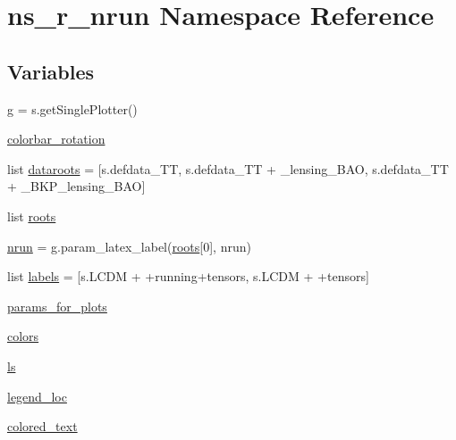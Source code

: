 \hypertarget{namespacens__r__nrun}{}\section{ns\+\_\+r\+\_\+nrun Namespace Reference}
\label{namespacens__r__nrun}
\subsection*{Variables}
\begin{DoxyCompactItemize}
\item 
\mbox{\hyperlink{namespacens__r__nrun_a424a0368f850ddbc3d383f3bf998868f}{g}} = s.\+get\+Single\+Plotter()
\item 
\mbox{\hyperlink{namespacens__r__nrun_a8a2fb51e906defe5e9a2a08293ccf214}{colorbar\+\_\+rotation}}
\item 
list \mbox{\hyperlink{namespacens__r__nrun_aa5b29f012951ccb18d66772eaa2a95d8}{dataroots}} = \mbox{[}s.\+defdata\+\_\+\+TT, s.\+defdata\+\_\+\+TT + \textquotesingle{}\+\_\+lensing\+\_\+\+B\+AO\textquotesingle{}, s.\+defdata\+\_\+\+TT + \textquotesingle{}\+\_\+\+B\+K\+P\+\_\+lensing\+\_\+\+B\+AO\textquotesingle{}\mbox{]}
\item 
list \mbox{\hyperlink{namespacens__r__nrun_a720cd55efbb91a6c0ff15a598fd9541e}{roots}}
\item 
\mbox{\hyperlink{namespacens__r__nrun_a98c2646daa6b4fda3d53343af2a88943}{nrun}} = g.\+param\+\_\+latex\+\_\+label(\mbox{\hyperlink{namespacens__r__nrun_a720cd55efbb91a6c0ff15a598fd9541e}{roots}}\mbox{[}0\mbox{]}, \textquotesingle{}nrun\textquotesingle{})
\item 
list \mbox{\hyperlink{namespacens__r__nrun_a37382ed12fcd9f7b4c9f1e530dd819b7}{labels}} = \mbox{[}s.\+L\+C\+DM + \textquotesingle{}+running+tensors\textquotesingle{}, s.\+L\+C\+DM + \textquotesingle{}+tensors\textquotesingle{}\mbox{]}
\item 
\mbox{\hyperlink{namespacens__r__nrun_aae65a65e20ca2b747da8781be6491252}{params\+\_\+for\+\_\+plots}}
\item 
\mbox{\hyperlink{namespacens__r__nrun_ad36e8636d9714fff06e643b8d454d9fc}{colors}}
\item 
\mbox{\hyperlink{namespacens__r__nrun_af04a10216c8391e8721147b61a47ae56}{ls}}
\item 
\mbox{\hyperlink{namespacens__r__nrun_a10511a76f6bbe5a61800430c7be299a4}{legend\+\_\+loc}}
\item 
\mbox{\hyperlink{namespacens__r__nrun_a50d67602de16172b1775dbf7c957b7ec}{colored\+\_\+text}}
\end{DoxyCompactItemize}


